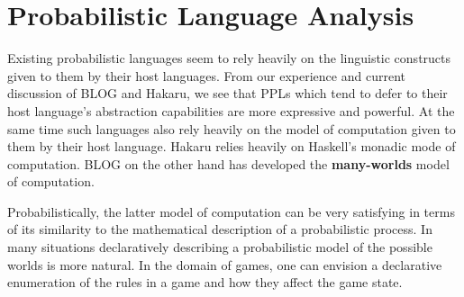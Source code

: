 
\section{Probabilistic Language Analysis} \label{sec:meta-analysis}

Existing probabilistic languages seem to rely heavily on the linguistic
constructs given to them by their host languages. From our experience and
current discussion of BLOG and Hakaru, we see that PPLs
which tend to defer to their host language's abstraction capabilities are more
expressive and powerful. At the same time such languages also rely
heavily on the model of computation given to them by their host language.
Hakaru relies heavily on Haskell's monadic mode of computation. BLOG on
the other hand has developed the {\bf many-worlds} model of computation.

Probabilistically, the latter model of computation can be very satisfying
in terms of its similarity to the mathematical description of a probabilistic
process. In many situations declaratively
describing a probabilistic model of the possible worlds is more natural.
In the domain of games, one can envision a declarative enumeration
of the rules in a game and how they affect the game state.

